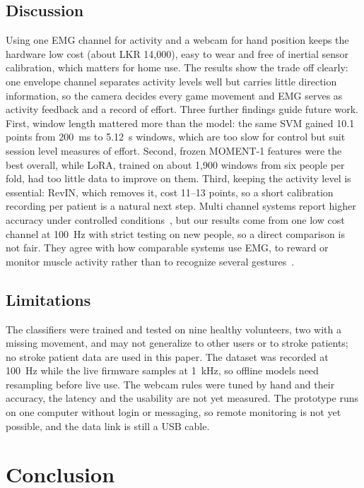\documentclass[10pt,a4paper,twocolumn]{article}
\begin{document}
\subsection{Discussion}

Using one EMG channel for activity and a webcam for hand position keeps the hardware low cost (about LKR 14,000), easy to wear and free of inertial sensor calibration, which matters for home use. The results show the trade off clearly: one envelope channel separates activity levels well but carries little direction information, so the camera decides every game movement and EMG serves as activity feedback and a record of effort. Three further findings guide future work. First, window length mattered more than the model: the same SVM gained 10.1 points from 200~ms to 5.12~s windows, which are too slow for control but suit session level measures of effort. Second, frozen MOMENT-1 features were the best overall, while LoRA, trained on about 1,900 windows from six people per fold, had too little data to improve on them. Third, keeping the activity level is essential: RevIN, which removes it, cost 11--13 points, so a short calibration recording per patient is a natural next step. Multi channel systems report higher accuracy under controlled conditions~\cite{jiang2018}, but our results come from one low cost channel at 100~Hz with strict testing on new people, so a direct comparison is not fair. They agree with how comparable systems use EMG, to reward or monitor muscle activity rather than to recognize several gestures~\cite{marin2021,ibrahim2024}.

\subsection{Limitations}

The classifiers were trained and tested on nine healthy volunteers, two with a missing movement, and may not generalize to other users or to stroke patients; no stroke patient data are used in this paper. The dataset was recorded at 100~Hz while the live firmware samples at 1~kHz, so offline models need resampling before live use. The webcam rules were tuned by hand and their accuracy, the latency and the usability are not yet measured. The prototype runs on one computer without login or messaging, so remote monitoring is not yet possible, and the data link is still a USB cable.

\section{Conclusion}
\end{document}
